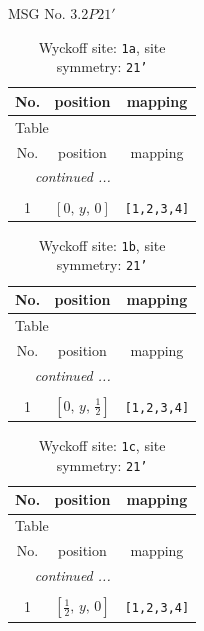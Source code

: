 \documentclass[fleqn,8pt]{jsarticle}
\begin{document}
\setcounter{MaxMatrixCols}{32}

\renewcommand{\tablename}{Table~}
\renewcommand{\figurename}{Figure~}
\begin{center}
\LARGE
MSG No. 3.2\quad$P21'$
\end{center}
\renewcommand{\arraystretch}{1.2}
\begin{longtable}{ccc}
\caption{Wyckoff site: {\tt 1a}, site symmetry: {\tt 21'}}
 \\
 \hline \hline
No. & position & mapping \\ \hline \endfirsthead

\multicolumn{2}{l}{\tablename\ \thetable{}} \\
 \hline \hline
No. & position & mapping \\ \hline \endhead

 \hline \hline
\multicolumn{2}{r}{\footnotesize\it continued ...} \\ \endfoot

 \hline \hline
\multicolumn{2}{r}{} \\ \endlastfoot

1 & $\left[ 0,\, y,\, 0 \right]$ & {\tt [1,2,3,4]} \\
\end{longtable}
\renewcommand{\arraystretch}{1.2}
\begin{longtable}{ccc}
\caption{Wyckoff site: {\tt 1b}, site symmetry: {\tt 21'}}
 \\
 \hline \hline
No. & position & mapping \\ \hline \endfirsthead

\multicolumn{2}{l}{\tablename\ \thetable{}} \\
 \hline \hline
No. & position & mapping \\ \hline \endhead

 \hline \hline
\multicolumn{2}{r}{\footnotesize\it continued ...} \\ \endfoot

 \hline \hline
\multicolumn{2}{r}{} \\ \endlastfoot

1 & $\left[ 0,\, y,\, \frac{1}{2} \right]$ & {\tt [1,2,3,4]} \\
\end{longtable}
\renewcommand{\arraystretch}{1.2}
\begin{longtable}{ccc}
\caption{Wyckoff site: {\tt 1c}, site symmetry: {\tt 21'}}
 \\
 \hline \hline
No. & position & mapping \\ \hline \endfirsthead

\multicolumn{2}{l}{\tablename\ \thetable{}} \\
 \hline \hline
No. & position & mapping \\ \hline \endhead

 \hline \hline
\multicolumn{2}{r}{\footnotesize\it continued ...} \\ \endfoot

 \hline \hline
\multicolumn{2}{r}{} \\ \endlastfoot

1 & $\left[ \frac{1}{2},\, y,\, 0 \right]$ & {\tt [1,2,3,4]} \\
\end{longtable}
\end{document}

